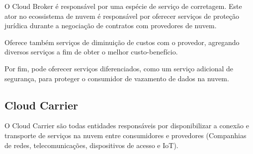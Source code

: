 O Cloud Broker é responsável por uma espécie de serviço de corretagem. Este ator no ecossistema de nuvem é responsável por oferecer serviços de proteção jurídica durante a negociação de contratos com provedores de nuvem. 

Oferece também serviços de diminuição de custos com o provedor, agregando diversos serviços a fim de obter o melhor custo-benefício.

Por fim, pode oferecer serviços diferenciados, como um serviço adicional de segurança, para proteger o consumidor de vazamento de dados na nuvem.


\subsection{Cloud Carrier}

O Cloud Carrier são todas entidades responsáveis por disponibilizar a conexão e transporte de serviços na nuvem entre consumidores e provedores (Companhias de redes, telecomunicações, dispositivos de acesso e IoT).
